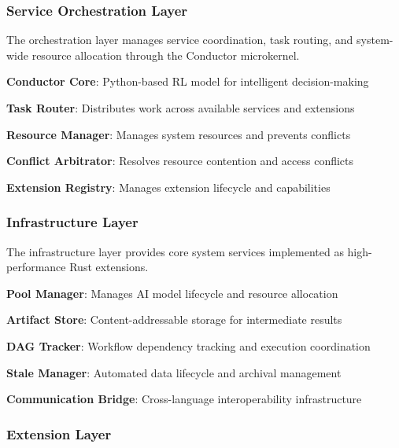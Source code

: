 \subsubsection*{Service Orchestration Layer}

The orchestration layer manages service coordination, task routing, and system-wide resource allocation through the Conductor microkernel.

\begin{compactlist}
    \item \textbf{Conductor Core}: Python-based RL model for intelligent decision-making
    \item \textbf{Task Router}: Distributes work across available services and extensions
    \item \textbf{Resource Manager}: Manages system resources and prevents conflicts
    \item \textbf{Conflict Arbitrator}: Resolves resource contention and access conflicts
    \item \textbf{Extension Registry}: Manages extension lifecycle and capabilities
\end{compactlist}

\subsubsection*{Infrastructure Layer}

The infrastructure layer provides core system services implemented as high-performance Rust extensions.

\begin{compactlist}
    \item \textbf{Pool Manager}: Manages AI model lifecycle and resource allocation
    \item \textbf{Artifact Store}: Content-addressable storage for intermediate results
    \item \textbf{DAG Tracker}: Workflow dependency tracking and execution coordination
    \item \textbf{Stale Manager}: Automated data lifecycle and archival management
    \item \textbf{Communication Bridge}: Cross-language interoperability infrastructure
\end{compactlist}

\subsubsection*{Extension Layer}

